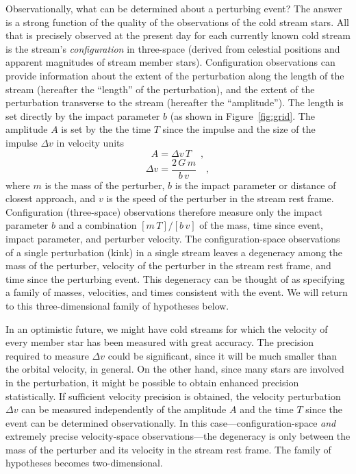 \documentclass[12pt,preprint]{aastex}
\begin{document}
Observationally, what can be determined about a perturbing event?  The
answer is a strong function of the quality of the observations of the
cold stream stars.  All that is precisely observed at the present day
for each currently known cold stream is the stream's
\emph{configuration} in three-space (derived from celestial positions
and apparent magnitudes of stream member stars).  Configuration
observations can provide information about
the extent of the perturbation along the length of
the stream (hereafter the ``length'' of the perturbation), and the
extent of the perturbation transverse to the stream (hereafter the
``amplitude'').  The length is set directly by the impact parameter
$b$ (as shown in Figure~\ref{fig:grid}.  The amplitude $A$ is set by
the the time $T$ since the impulse and the size of the impulse $\Delta
v$ in velocity units
\begin{equation}
A = \Delta v\,T \quad ,
\end{equation}
\begin{equation}
\Delta v = \frac{2\,G\,m}{b\,v} \quad ,
\end{equation}
where $m$ is the mass of the perturber, $b$ is the impact parameter or
distance of closest approach, and $v$ is the speed of the perturber in
the stream rest frame.  Configuration (three-space) observations
therefore measure only the impact parameter $b$ and a combination
$[m\,T]/[b\,v]$ of the mass, time since event, impact parameter, and
perturber velocity.  The configuration-space observations of a single
perturbation (kink) in a single stream leaves a degeneracy among the
mass of the perturber, velocity of the perturber in the stream rest
frame, and time since the perturbing event.  This degeneracy can be
thought of as specifying a family of masses, velocities, and times
consistent with the event.  We will return to this three-dimensional
family of hypotheses below.

In an optimistic future, we might have cold streams for which the
velocity of every member star has been measured with great accuracy.
The precision required to measure $\Delta v$ could be significant,
since it will be much smaller than the orbital velocity, in general.
On the other hand, since many stars are involved in the perturbation,
it might be possible to obtain enhanced precision statistically.  If
sufficient velocity precision is obtained, the velocity perturbation
$\Delta v$ can be measured independently of the amplitude $A$ and the
time $T$ since the event can be determined observationally.  In this
case---configuration-space \emph{and} extremely precise velocity-space
observations---the degeneracy is only between the mass of the
perturber and its velocity in the stream rest frame.  The family of
hypotheses becomes two-dimensional.
\end{document}
